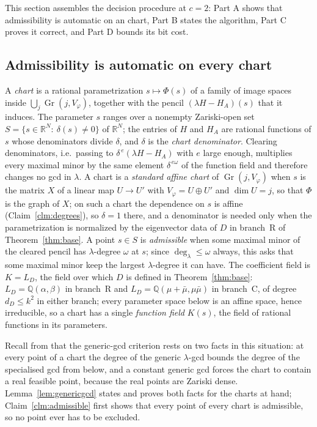 \documentclass[journal]{IEEEtran}
\theoremstyle{plainn}
\theoremstyle{remark}
\newcommand{\Gr}{\operatorname{Gr}}
\begin{document}
This section assembles the decision procedure at $c=2$: Part A shows that admissibility is automatic on
an chart, Part B states the algorithm, Part C proves it correct, and Part D bounds its bit
cost.

\subsection{Admissibility is automatic on every chart}\label{sec:admissible}

A \emph{chart} is a rational parametrization $s\mapsto\Phi(s)$ of a family of image spaces inside
$\bigcup_j\Gr(j,V_\varphi)$, together with the pencil $(\lambda H-H_A)(s)$ that it induces. The parameter
$s$ ranges over a nonempty Zariski-open set $S=\{s\in\mathbb R^N:\ \delta(s)\neq0\}$ of $\mathbb R^N$; the
entries of $H$ and $H_A$ are rational functions of $s$ whose denominators divide $\delta$, and $\delta$ is
the \emph{chart denominator}. Clearing denominators, i.e.\ passing to $\delta^{\,e}(\lambda H-H_A)$ with $e$
large enough, multiplies every maximal minor by the same element $\delta^{\,e\omega}$ of the function field
and therefore changes no gcd in $\lambda$. A chart is a \emph{standard affine chart} of $\Gr(j,V_\varphi)$
when $s$ is the matrix $X$ of a linear map $U\to U'$ with $V_\varphi=U\oplus U'$ and $\dim U=j$, so that
$\Phi$ is the graph of $X$; on such a chart the dependence on $s$ is affine
(Claim~\ref{clm:degrees}), so $\delta=1$ there, and a denominator is needed only when the parametrization is
normalized by the eigenvector data of $D$ in branch~R of Theorem~\ref{thm:base}. A point $s\in S$ is
\emph{admissible} when some maximal minor of the cleared pencil has $\lambda$-degree $\omega$ at $s$; since
$\deg_\lambda\le\omega$ always, this asks that some maximal minor keep the largest $\lambda$-degree it can
have. The coefficient field is $K=L_D$, the field over which $D$ is defined in
Theorem~\ref{thm:base}: $L_D=\mathbb Q(\alpha,\beta)$ in branch~R and
$L_D=\mathbb Q(\mu+\bar\mu,\mu\bar\mu)$ in branch~C, of degree $d_D\le k^2$ in either branch; every
parameter space below is an affine space, hence irreducible, so a chart has a
single \emph{function field} $K(s)$, the field of rational functions in its parameters.

Recall from \cite{companion3} that the generic-gcd criterion rests on two facts in this situation: at every
point of a chart the degree of the generic $\lambda$-gcd bounds the degree of the specialised gcd from
below, and a constant generic gcd forces the chart to contain a real feasible point, because the real points
are Zariski dense. Lemma~\ref{lem:genericgcd} states and proves both facts for the charts at hand;
Claim~\ref{clm:admissible} first shows that every point of every chart is admissible, so no point ever has
to be excluded.
\end{document}
